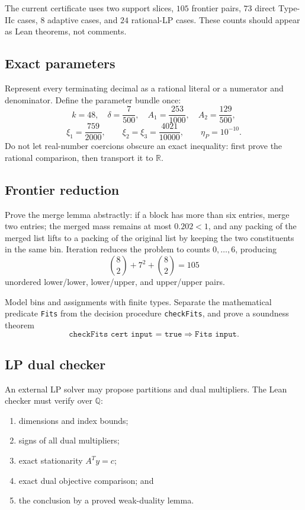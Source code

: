 \documentclass[11pt]{article}
\newcommand{\leanname}[1]{\texttt{#1}}
\begin{document}
The current certificate uses two support slices, \(105\) frontier pairs,
\(73\) direct Type-IIc cases, \(8\) adaptive cases, and \(24\) rational-LP
cases.  These counts should appear as Lean theorems, not comments.

\subsection{Exact parameters}

Represent every terminating decimal as a rational literal or a numerator and
denominator.  Define the parameter bundle once:
\[
 k=48,\quad \delta=\frac7{500},\quad
 A_1=\frac{253}{1000},\quad A_2=\frac{129}{500},
\]
\[
 \xi_1=\frac{759}{2000},\qquad
 \xi_2=\xi_3=\frac{4021}{10000},\qquad
 \eta_P=10^{-10}.
\]
Do not let real-number coercions obscure an exact inequality: first prove the
rational comparison, then transport it to \(\mathbb R\).

\subsection{Frontier reduction}

Prove the merge lemma abstractly: if a block has more than six entries, merge
two entries; the merged mass remains at most \(0.202<1\), and any packing of the
merged list lifts to a packing of the original list by keeping the two
constituents in the same bin.  Iteration reduces the problem to counts
\(0,\ldots,6\), producing
\[
 \binom82+7^2+\binom82=105
\]
unordered lower/lower, lower/upper, and upper/upper pairs.

Model bins and assignments with finite types.  Separate the mathematical
predicate \leanname{Fits} from the decision procedure \leanname{checkFits}, and
prove a soundness theorem
\[
 \leanname{checkFits cert input = true}\Longrightarrow
 \leanname{Fits input}.
\]

\subsection{LP dual checker}

An external LP solver may propose partitions and dual multipliers.  The Lean
checker must verify over \(\mathbb Q\):

\begin{enumerate}
\item dimensions and index bounds;
\item signs of all dual multipliers;
\item exact stationarity \(A^{T}y=c\);
\item exact dual objective comparison; and
\item the conclusion by a proved weak-duality lemma.
\end{enumerate}
\end{document}
